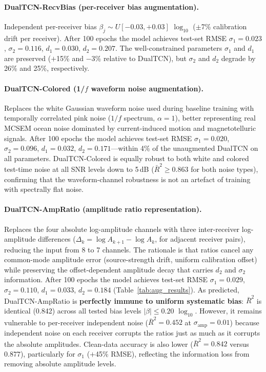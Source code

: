 \documentclass[journal]{IEEEtran}
\begin{document}
\paragraph{DualTCN-RecvBias (per-receiver bias augmentation).}
Independent per-receiver bias $\beta_j \sim U[-0.03, +0.03]$
$\log_{10}$ ($\pm$7\% calibration drift per receiver).  After 100
epochs the model achieves test-set RMSE $\sigma_1 = 0.023$,
$\sigma_2 = 0.116$, $d_1 = 0.030$, $d_2 = 0.207$.  The
well-constrained parameters $\sigma_1$ and $d_1$ are preserved
($+$15\% and $-$3\% relative to DualTCN), but $\sigma_2$ and $d_2$
degrade by 26\% and 25\%, respectively.

\paragraph{DualTCN-Colored (1/$f$ waveform noise augmentation).}
Replaces the white Gaussian waveform noise used during baseline
training with temporally correlated pink noise ($1/f$ spectrum,
$\alpha = 1$), better representing real MCSEM ocean noise dominated
by current-induced motion and magnetotelluric signals.  After 100
epochs the model achieves test-set RMSE $\sigma_1 = 0.020$,
$\sigma_2 = 0.096$, $d_1 = 0.032$, $d_2 = 0.171$---within 4\% of
the unaugmented DualTCN on all parameters.  DualTCN-Colored is equally robust to both white and
colored test-time noise at all SNR levels down to 5\,dB
($\bar{R}^2 \geq 0.863$ for both noise types), confirming that the
waveform-channel robustness is not an artefact of training with
spectrally flat noise.

\paragraph{DualTCN-AmpRatio (amplitude ratio representation).}
Replaces the four absolute log-amplitude channels with three
inter-receiver log-amplitude differences
($\Delta_k = \log A_{k+1} - \log A_k$, for adjacent receiver pairs),
reducing the input from 8 to 7 channels.  The rationale is that
ratios cancel any common-mode amplitude error (source-strength drift,
uniform calibration offset) while preserving the offset-dependent
amplitude decay that carries $d_2$ and $\sigma_2$ information.
After 100 epochs the model achieves test-set RMSE $\sigma_1 = 0.029$,
$\sigma_2 = 0.110$, $d_1 = 0.033$, $d_2 = 0.184$
(Table~\ref{tab:aug_results}).  As predicted, DualTCN-AmpRatio is
\textbf{perfectly immune to uniform systematic bias}: $\bar{R}^2$
is identical (0.842) across all tested bias levels
$|\beta| \leq 0.20$ $\log_{10}$.  However, it
remains vulnerable to per-receiver independent noise
($\bar{R}^2 = 0.452$ at $\sigma_\mathrm{amp} = 0.01$) because
independent noise on each receiver corrupts the ratios just as much
as it corrupts the absolute amplitudes.  Clean-data accuracy is also
lower ($\bar{R}^2 = 0.842$ versus $0.877$), particularly for
$\sigma_1$ ($+$45\% RMSE), reflecting the information loss from
removing absolute amplitude levels.
\end{document}
